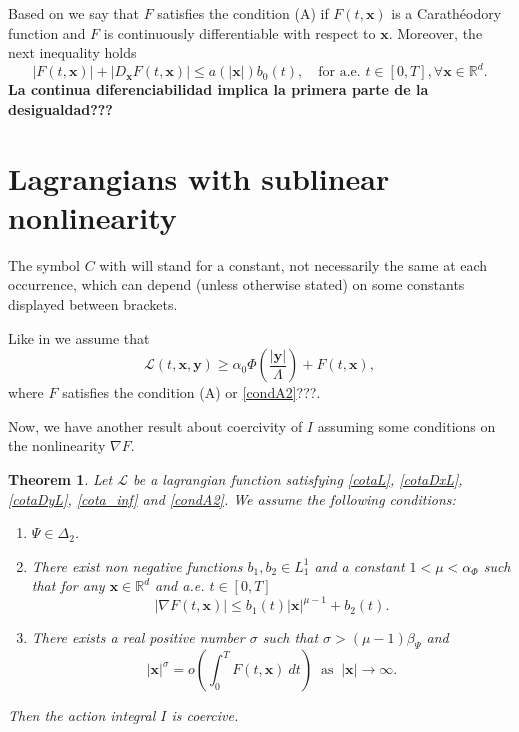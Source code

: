 \documentclass[twoside]{article}
\newtheorem{thm}{Theorem}[section]
\theoremstyle{remark}
\renewcommand{\b}[1]{\boldsymbol{#1}}
\newcommand{\rr}{\mathbb{R}}
\renewcommand{\leq}{\leqslant}
\begin{document}
Based on \cite{mawhin2010critical} we say that $F$ satisfies the condition (A) if  $F(t,\b{x})$ is a Carath\'eo\-dory function and  $F$ is continuously differentiable with respect to $\b{x}$. Moreover, the next inequality holds 
\begin{equation}\label{condA2}|F(t,\b{x})|+ |D_{\b{x}}F(t,\b{x})|\leq a(|\b{x}|)b_0(t),\quad\text{for a.e. }t\in [0,T], \forall\b{x}\in\rr^d.
\end{equation}
{\bf La continua diferenciabilidad  implica la primera parte de la desigualdad???}

\section{Lagrangians with sublinear nonlinearity}

The symbol $C$ with  will stand for a constant, not necessarily the same at each occurrence, which can depend (unless otherwise stated) on some constants displayed between brackets.

Like in \cite{ABGMS2015} we assume that
\begin{equation}\label{cota_inf}
\mathcal{L}(t,\b{x},\b{y})\geq \alpha_0\Phi\left(\frac{|\b{y}|}{\Lambda}\right)+ F(t,\b{x}),
\end{equation}
where $F$ satisfies the condition (A) or \eqref{condA2}???.

Now, we have another result about coercivity of $I$ assuming some conditions on the nonlinearity $\nabla F$. 

\begin{thm}\label{coercitividad-r}
Let  $\mathcal{L}$ be a lagrangian function satisfying \eqref{cotaL}, \eqref{cotaDxL}, \eqref{cotaDyL}, \eqref{cota_inf}  and \eqref{condA2}. We assume the following conditions:
\begin{enumerate}
\item $\Psi\in\Delta_2$.
\item There exist  non negative functions  $b_1,b_2 \in L^1_1$ and a constant $1<\mu<\alpha_{\Phi}$  such that 
for any $\b{x}\in\rr^d$ and a.e. $t\in [0,T]$
\begin{equation}\label{holder_cont-mu}
  \left| \nabla F(t,\b{x}) \right|\leq b_1(t)|\b{x}|^{\mu-1}+b_2(t).
\end{equation}
\item There exists a real positive number $\sigma$ such that $\sigma>(\mu-1)\beta_{\Psi}$ and
\begin{equation}\label{propiedad-coercividad-mu}
|\b{x}|^{\sigma}=o\left(\int_{0}^{T}F(t,\b{x})\ dt\right)\;\;\mbox{as}\;\;|\b{x}|\to \infty.
\end{equation}
\end{enumerate}
Then  the action integral $I$ is coercive.
\end{thm}
\end{document}
